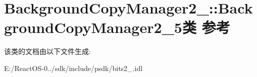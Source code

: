 \hypertarget{class_background_copy_manager2__5_1_1_background_copy_manager2__5}{}\section{Background\+Copy\+Manager2\+\_\+:\+:Background\+Copy\+Manager2\+\_\+5类 参考}
\label{class_background_copy_manager2__5_1_1_background_copy_manager2__5}


该类的文档由以下文件生成\+:\begin{DoxyCompactItemize}
\item 
E\+:/\+React\+O\+S-\/0../sdk/include/psdk/bits2\+\_.\+idl\end{DoxyCompactItemize}
